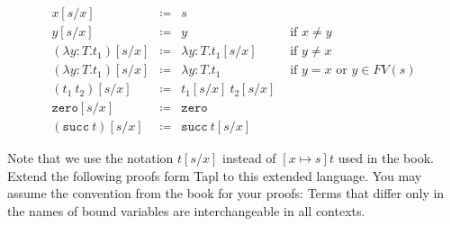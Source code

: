 \begin{minipage}{\textwidth}
  \begin{minipage}{0.5\textwidth}
    \begin{prooftree}
    \end{prooftree}
  \end{minipage}
  \hfill
  \begin{minipage}{0.4\textwidth}
    \begin{prooftree}
    \end{prooftree}
  \end{minipage}
  \hfill
\end{minipage}
\hfill

\begin{minipage}{\textwidth}
  \vspace{2em}
  \[
    \begin{array}{lcrr }
      x[s/x] & \coloneq & s\\
      y[s/x] & \coloneq & y & \text{ if } x\neq y\\
      (\lambda y:T.t_1)[s/x] & \coloneq & \lambda y:T. t_1[s/x] & \text{ if } y\neq x\\
      (\lambda y:T.t_1)[s/x] & \coloneq & \lambda y:T.t_1 & \text{ if } y=x \text{ or } y\in FV(s)\\
      (t_1\ t_2)[s/x] & \coloneq & t_1[s/x]\ t_2[s/x]\\
      \mathtt{zero}[s/x] & \coloneq & \mathtt{zero}\\
      (\mathtt{succ}\ t)[s/x] & \coloneq & \mathtt{succ}\ t[s/x]
    \end{array}
  \]
  \hfill \vspace{1em}
\end{minipage}
Note that we use the notation $t[s/x]$ instead of $[x\mapsto s]t$ used in the book.\\
Extend the following proofs form Tapl to this extended language. 
You may assume the convention from the book for your proofs: 
Terms that differ only in the names of bound variables are interchangeable in all contexts. 

